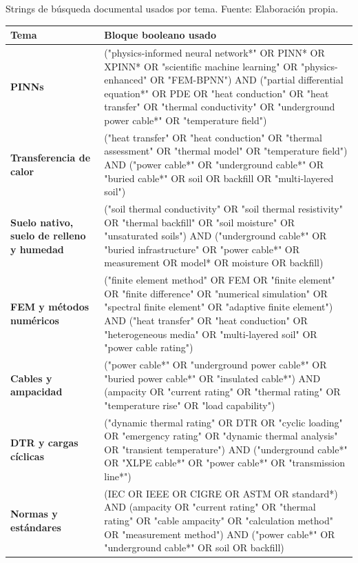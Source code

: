 \clearpage
\begin{landscape}
\thispagestyle{empty}
\begin{center}
\captionsetup{type=table,hypcap=false}
\caption{Strings de búsqueda documental usados por tema. Fuente: Elaboración propia.}
\label{tab:strings-documentales}
\vspace{0.4em}
\footnotesize
\setlength{\tabcolsep}{5pt}
\renewcommand{\arraystretch}{1.22}
\begin{tabularx}{\linewidth}{>{\bfseries}L{4.1cm}>{\ttfamily\scriptsize\RaggedRight\arraybackslash}X}
\toprule
\normalfont\bfseries Tema & \normalfont\bfseries Bloque booleano usado \\
\midrule
PINNs & ("physics-informed neural network*" OR PINN* OR XPINN* OR "scientific machine learning" OR "physics-enhanced" OR "FEM-BPNN") AND ("partial differential equation*" OR PDE OR "heat conduction" OR "heat transfer" OR "thermal conductivity" OR "underground power cable*" OR "temperature field") \\
\addlinespace[0.35em]
Transferencia de calor & ("heat transfer" OR "heat conduction" OR "thermal assessment" OR "thermal model" OR "temperature field") AND ("power cable*" OR "underground cable*" OR "buried cable*" OR soil OR backfill OR "multi-layered soil") \\
\addlinespace[0.35em]
Suelo nativo, suelo de relleno y humedad & ("soil thermal conductivity" OR "soil thermal resistivity" OR "thermal backfill" OR "soil moisture" OR "unsaturated soils") AND ("underground cable*" OR "buried infrastructure" OR "power cable*" OR measurement OR model* OR moisture OR backfill) \\
\addlinespace[0.35em]
FEM y métodos numéricos & ("finite element method" OR FEM OR "finite element" OR "finite difference" OR "numerical simulation" OR "spectral finite element" OR "adaptive finite element") AND ("heat transfer" OR "heat conduction" OR "heterogeneous media" OR "multi-layered soil" OR "power cable rating") \\
\addlinespace[0.35em]
Cables y ampacidad & ("power cable*" OR "underground power cable*" OR "buried power cable*" OR "insulated cable*") AND (ampacity OR "current rating" OR "thermal rating" OR "temperature rise" OR "load capability") \\
\addlinespace[0.35em]
DTR y cargas cíclicas & ("dynamic thermal rating" OR DTR OR "cyclic loading" OR "emergency rating" OR "dynamic thermal analysis" OR "transient temperature") AND ("underground cable*" OR "XLPE cable*" OR "power cable*" OR "transmission line*") \\
\addlinespace[0.35em]
Normas y estándares & (IEC OR IEEE OR CIGRE OR ASTM OR standard*) AND (ampacity OR "current rating" OR "thermal rating" OR "cable ampacity" OR "calculation method" OR "measurement method") AND ("power cable*" OR "underground cable*" OR soil OR backfill) \\
\bottomrule
\end{tabularx}


\end{center}
\end{landscape}
